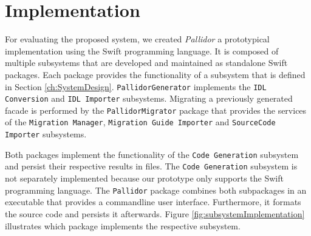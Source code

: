\section{Implementation}
\label{sec:Implementation}

For evaluating the proposed system, we created \textit{Pallidor} a prototypical implementation using the Swift programming language. It is composed of multiple subsystems that are developed and maintained as standalone Swift packages. Each package provides the functionality of a subsystem that is defined in Section \ref{ch:SystemDesign}. \texttt{PallidorGenerator} implements the \texttt{IDL Conversion} and \texttt{IDL Importer} subsystems. Migrating a previously generated facade is performed by the \texttt{Pal\-lidor\-Migrator} package that provides the services of the \texttt{Migration Ma\-na\-ger}, \texttt{Migration Guide Importer} and \texttt{SourceCode Importer} subsystems. 

\begin{figure}[!h]
\end{figure}
Both packages implement the functionality of the \texttt{Code Generation} subsystem and persist their respective results in files. The \texttt{Code Generation} subsystem is not separately implemented because our prototype only supports the Swift programming language. The \texttt{Pallidor} package combines both subpackages in an executable that provides a commandline user interface. Furthermore, it formats the source code and persists it afterwards. Figure \ref{fig:subsystemImplementation} illustrates which package implements the respective subsystem.  

